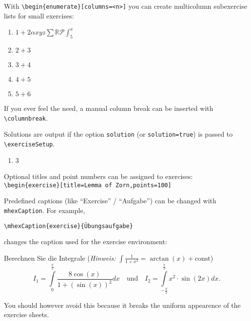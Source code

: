 \documentclass[german]{mhexsheet}
\begin{document}
\maketitle

\begin{exercise}
With \verb|\begin{enumerate}[columns=<n>]| you can create multicolumn subexercise lists for small exercises:
\begin{enumerate}[columns=3]
  \item $1+2\alpha xyz \sum\mathbb{R}\mathcal{P}\int_5^x$
  \item $2+3$
  \item $3+4$
  \item $4+5$
  \item $5+6$
\end{enumerate}
If you ever feel the need, a manual column break can be inserted with \verb|\columnbreak|.
\end{exercise}

\begin{solution}
Solutions are output if the option \verb|solution| (or \verb|solution=true|) is passed to \verb|\exerciseSetup|.
\begin{enumerate}
\item 3
\end{enumerate}
\end{solution}

\begin{exercise}[title=Lemma of Zorn,points=100]
Optional titles and point numbers can be assigned to exercises:\\
\verb!\begin{exercise}[title=Lemma of Zorn,points=100]!
\end{exercise}
Predefined captions (like \enquote{Exercise} / \enquote{Aufgabe}) can be changed with \verb|mhexCaption|. For example,
\begin{verbatim}
\mhexCaption{exercise}{Übungsaufgabe}
\end{verbatim}
changes the caption used for the exercise environment:
\begin{exercise}
Berechnen Sie die Integrale (\textit{Hinweis:} $\int \frac{1}{1+x^2}=\arctan(x)+\text{const}$)
\begin{equation*}
I_1=\int\limits_0^\frac{\pi}{2} \frac{8\cos(x)}{1+(\sin(x))^2}dx\quad \text{und}\quad I_2=\int\limits_{-\frac{\pi}{2}}^{\frac{\pi}{2}}x^2\cdot\sin(2x)dx.
\end{equation*}
\end{exercise}
You should however avoid this because it breaks the uniform appearence of the exercise sheets.
\end{document}
